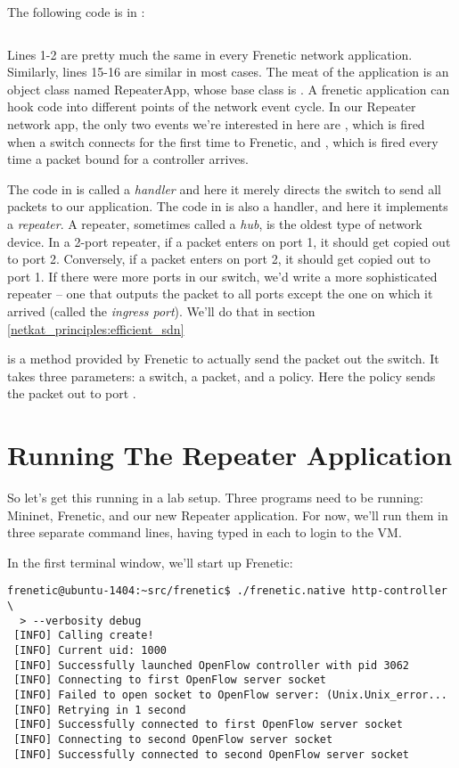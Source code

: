 The following code is in :

\inputminted[linenos]{python}{code/quick_start/repeater.py}

Lines 1-2 are pretty much the same in every Frenetic network application.
Similarly, lines 15-16 are similar in most cases. 
 The meat of the application is an object class named RepeaterApp, whose base class is .
A frenetic application can hook code into different points of the network event cycle.
In our Repeater network app, the only two events we're interested in here are
, which is fired when a switch connects for the first time to Frenetic, and 
 , which is fired every time a packet
bound for a controller arrives.

The code in  is called a \emph{handler} and here it 
merely directs the switch to send all packets to our application.
The code in  is also a handler, and here it implements a {\it repeater}.
A repeater, sometimes called a {\it hub}, is the oldest type of network device. 
In a 2-port repeater, if a packet enters on port 1, it should get copied out to port 2.  
Conversely, if a packet enters on port 2, it should get copied out to port 1.
If there were more ports in our switch, we'd write a more sophisticated repeater -- one that
outputs the packet to all ports except the one on which it arrived (called the {\it ingress port}). 
We'll do that in section \ref{netkat_principles:efficient_sdn} 

 is a method provided by Frenetic to actually send the packet out the switch.  It takes three 
parameters: a switch, a packet, and a policy.  
Here the policy sends the packet out to port .   

\section{Running The Repeater Application}

So let's get this running in a lab setup.  
Three programs need to be running:  Mininet, Frenetic, and our new Repeater application.  
For now, we'll run them in three separate command lines, having typed  in each
to login to the VM.

In the first terminal window, we'll start up Frenetic:

\begin{verbatim}
frenetic@ubuntu-1404:~src/frenetic$ ./frenetic.native http-controller \
  > --verbosity debug
 [INFO] Calling create!
 [INFO] Current uid: 1000
 [INFO] Successfully launched OpenFlow controller with pid 3062
 [INFO] Connecting to first OpenFlow server socket
 [INFO] Failed to open socket to OpenFlow server: (Unix.Unix_error...
 [INFO] Retrying in 1 second
 [INFO] Successfully connected to first OpenFlow server socket
 [INFO] Connecting to second OpenFlow server socket
 [INFO] Successfully connected to second OpenFlow server socket 
\end{verbatim}

